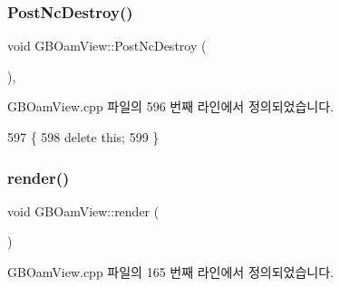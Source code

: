 \subsubsection{\texorpdfstring{Post\+Nc\+Destroy()}{PostNcDestroy()}}
{\footnotesize\ttfamily void G\+B\+Oam\+View\+::\+Post\+Nc\+Destroy (\begin{DoxyParamCaption}{ }\end{DoxyParamCaption})\hspace{0.3cm}{\ttfamily [protected]}, {\ttfamily [virtual]}}



G\+B\+Oam\+View.\+cpp 파일의 596 번째 라인에서 정의되었습니다.


\begin{DoxyCode}
597 \{
598   \textcolor{keyword}{delete} \textcolor{keyword}{this};
599 \}
\end{DoxyCode}
\mbox{\label{class_g_b_oam_view_a6862114f9b3873d08f7ae8bd465c2eda}} 
\subsubsection{\texorpdfstring{render()}{render()}}
{\footnotesize\ttfamily void G\+B\+Oam\+View\+::render (\begin{DoxyParamCaption}{ }\end{DoxyParamCaption})}



G\+B\+Oam\+View.\+cpp 파일의 165 번째 라인에서 정의되었습니다.


